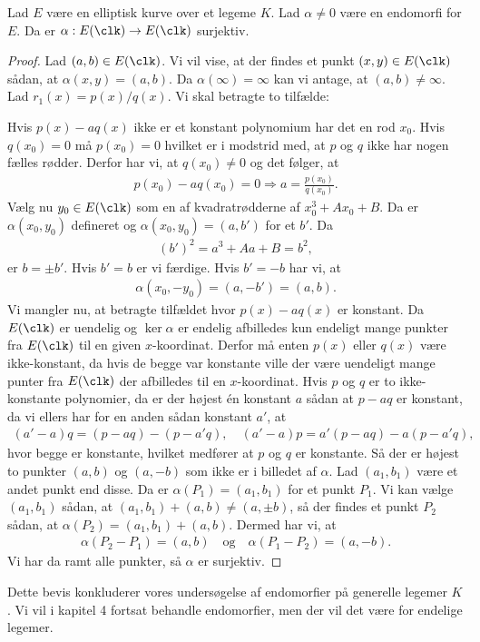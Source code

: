 \begin{thm}
\label{endomorfier:surjektiv}
Lad $E$ være en elliptisk kurve over et legeme $K$. Lad $\alpha \neq 0$ være en endomorfi for $E$. Da er $\alpha : E(\clk) \to E(\clk)$ surjektiv.
\end{thm}
\begin{proof}
Lad $(a, b) \in E(\clk)$. Vi vil vise, at der findes et punkt $(x, y) \in E(\clk)$ sådan, at $\alpha(x, y) = (a, b)$. Da $\alpha(\infty) = \infty$ kan vi antage, at $(a,b) \neq \infty$. Lad $r_1(x) = p(x)/q(x)$. Vi skal betragte to tilfælde:

Hvis $p(x) - aq(x)$ ikke er et konstant polynomium har det en rod $x_0$. Hvis $q(x_0)=0$ må $p(x_0) = 0$ hvilket er i modstrid med, at $p$ og $q$ ikke har nogen fælles rødder. Derfor har vi, at $q(x_0) \neq 0$ og det følger, at 
\begin{align*}
	p(x_0) - aq(x_0) = 0 \Rightarrow a = \frac{p(x_0)}{q(x_0)}.
\end{align*}
Vælg nu $y_0 \in E(\clk)$ som en af kvadratrødderne af $x_{0}^{3} + Ax_0 + B$. Da er $\alpha(x_0, y_0)$ defineret og $\alpha(x_0, y_0) = (a, b')$ for et $b'$. Da 
\begin{align*}
	(b')^2 = a^3 + Aa + B = b^2,
\end{align*}
er $b=\pm b'$. Hvis $b'=b$ er vi færdige. Hvis $b'=-b$ har vi, at 
\begin{align*}
	\alpha(x_0, -y_0) = (a, -b') = (a, b).
\end{align*}
Vi mangler nu, at betragte tilfældet hvor $p(x)-aq(x)$ er konstant. Da $E(\clk)$ er uendelig og $\ker \alpha$ er endelig afbilledes kun endeligt mange punkter fra $E(\clk)$ til en given $x$-koordinat. Derfor må enten $p(x)$ eller $q(x)$ være ikke-konstant, da hvis de begge var konstante ville der være uendeligt mange punter fra $E(\clk)$ der afbilledes til en $x$-koordinat. Hvis $p$ og $q$ er to ikke-konstante polynomier, da er der højest én konstant $a$ sådan at $p-aq$ er konstant, da vi ellers har for en anden sådan konstant $a'$, at 
\begin{align*}
	(a' - a)q = (p - aq) - (p - a'q), \quad (a'-a)p=a'(p-aq)-a(p-a'q),
\end{align*}
hvor begge er konstante, hvilket medfører at $p$ og $q$ er konstante. Så der er højest to punkter $(a,b)$ og $(a,-b)$ som ikke er i billedet af $\alpha$. Lad $(a_1, b_1)$ være et andet punkt end disse. Da er $\alpha(P_1)=(a_1, b_1)$ for et punkt $P_1$. Vi kan vælge $(a_1, b_1)$ sådan, at $(a_1, b_1) + (a, b) \neq (a, \pm b)$, så der findes et punkt $P_2$ sådan, at $\alpha(P_2)=(a_1, b_1) + (a,b)$. Dermed har vi, at 
\begin{align*}
	\alpha(P_2 - P_1) = (a, b) \quad \text{og} \quad \alpha(P_1 - P_2) = (a, -b).
\end{align*}
Vi har da ramt alle punkter, så $\alpha$ er surjektiv.
\end{proof}
Dette bevis konkluderer vores undersøgelse af endomorfier på generelle legemer $K$. Vi vil i kapitel 4 fortsat behandle endomorfier, men der vil det være for endelige legemer.
















